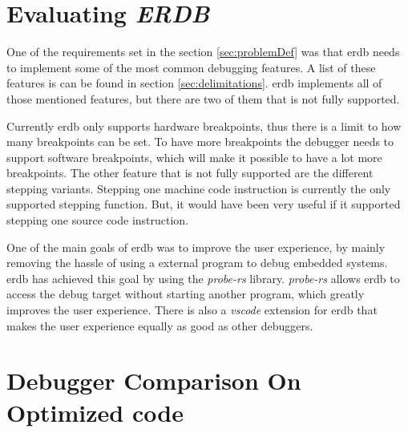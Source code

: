 \section{Evaluating \emph{ERDB}} %
One of the requirements set in the section \ref{sec:problemDef} was that \gls{erdb} needs to implement some of the most common debugging features.
A list of these features is can be found in section \ref{sec:delimitations}.
\gls{erdb} implements all of those mentioned features, but there are two of them that is not fully supported.


Currently \gls{erdb} only supports hardware breakpoints, thus there is a limit to how many breakpoints can be set.
To have more breakpoints the debugger needs to support software breakpoints, which will make it possible to have a lot more breakpoints.
The other feature that is not fully supported are the different stepping variants.
Stepping one machine code instruction is currently the only supported stepping function.
But, it would have been very useful if it supported stepping one source code instruction.


One of the main goals of \gls{erdb} was to improve the user experience, by mainly removing the hassle of using a external program to debug embedded systems.
\gls{erdb} has achieved this goal by using the \emph{probe-rs} library.
\emph{probe-rs} allows \gls{erdb} to access the debug target without starting another program, which greatly improves the user experience.
There is also a \emph{vscode} extension for \gls{erdb} that makes the user experience equally as good as other debuggers.



\section{Debugger Comparison On Optimized code} %
\label{sec:debuggercomparison}




